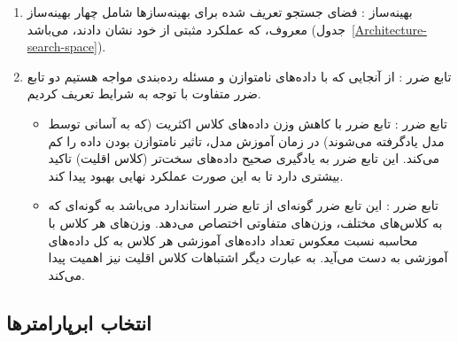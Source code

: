 \begin{enumerate}
\begin{itemize}
	\end{itemize}
	\item بهینه‌ساز
	: فضای جستجو تعریف شده برای بهینه‌سازها شامل چهار بهینه‌ساز معروف، که عملکرد مثبتی از خود نشان دادند، می‌باشد (جدول~\ref{Architecture-search-space}).
	\item تابع ضرر
	:
از‌ آنجایی که با داده‌های نامتوازن و مسئله رده‌بندی مواجه هستیم دو تابع ضرر متفاوت با توجه به شرایط تعریف کردیم.
	
	\begin{itemize}
		\item تابع ضرر
		:
		تابع ضرر
		 \cite{Lin-2017-ICCV}
		با کاهش وزن داده‌های کلاس اکثریت (که به آسانی توسط مدل یادگرفته می‌شوند) در زمان آموزش مدل، تاثیر نامتوازن بودن داده را کم می‌کند. این تابع ضرر به یادگیری صحیح داده‌های سخت‌تر (کلاس اقلیت) تاکید بیشتری دارد تا به این صورت عملکرد نهایی بهبود پیدا کند.
		
		\item تابع ضرر
		:
		این تابع ضرر گونه‌ای از تابع ضرر استاندارد
		می‌باشد به گونه‌ای که به کلاس‌های مختلف، وزن‌های متفاوتی اختصاص می‌دهد. وزن‌های هر کلاس با محاسبه نسبت معکوس تعداد داده‌های آموزشی هر کلاس به کل داده‌های آموزشی به دست می‌آید. به عبارت دیگر اشتباهات کلاس‌ اقلیت نیز اهمیت پیدا می‌کند.
	\end{itemize}
\end{enumerate}

\subsection{انتخاب ابرپارامترها}

